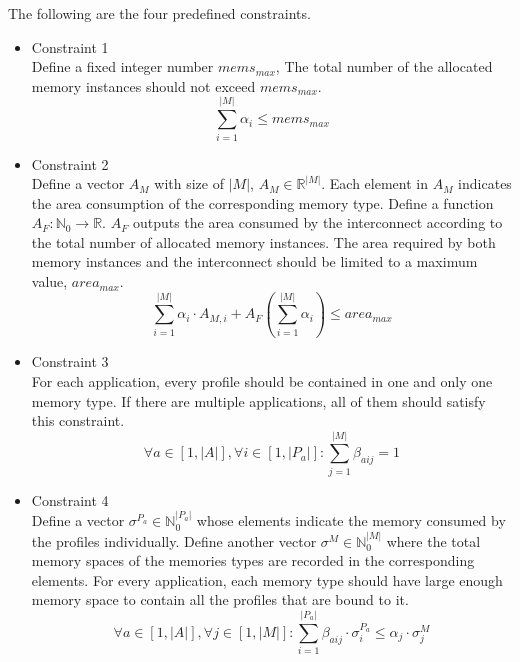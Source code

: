 	The following are the four predefined constraints.
	
	\begin{itemize}
		\item Constraint 1 \\
			Define a fixed integer number $mems_{max}$, 
			The total number of the allocated memory instances
			should not exceed $mems_{max}$.
			\begin{equation}
			\label{equa:constraint_1}
				\sum_{i=1}^{\lvert M \rvert} \alpha_{i}
				\leq mems_{max}
			\end{equation}
		\item Constraint 2 \\
			Define a vector $A_{M}$ with size of $\lvert M \lvert$,
			$A_{M} \in \mathbb{R}^{\lvert M \lvert}$. Each element in
			$A_{M}$ indicates the area consumption of the corresponding
			memory type.
			Define a function $A_{F} \colon \mathbb{N}_{0}
			\rightarrow \mathbb{R}$. $A_{F}$ outputs the area consumed
			by the interconnect according to the total number of allocated
			memory instances.
			The area required by both memory instances and the interconnect
			should be limited to a maximum value, $area_{max}$.
			\begin{equation}
			\label{equa:constraint_2}
				\sum_{i=1}^{\lvert M \rvert} \alpha_{i} \cdot A_{M,i}
				+ A_{F} ( \sum_{i=1}^{\lvert M \rvert} \alpha_{i} ) 
				\leq area_{max}
			\end{equation}			
		\item Constraint 3 \\
			For each application, every profile should be contained in one
			and only one memory type. If there are multiple applications, all
			of them should satisfy this constraint.
			\begin{equation}
			\label{equa:constraint_3}
				\forall a \in \left[ 1, \lvert A \rvert \right], 
				\forall i \in \left[ 1, \lvert P_a \rvert \right] \colon
				\sum_{j=1}^{\lvert M \rvert} \beta_{aij} = 1
			\end{equation}		
		\item Constraint 4 \\
			Define a vector
			$\sigma^{P_{a}} \in \mathbb{N}_{0}^{\lvert P_{a} \rvert} $
			whose elements indicate the memory consumed by the profiles
			individually.
			Define another vector
			$\sigma^{M} \in \mathbb{N}_{0}^{\lvert M \rvert}$
			where the total memory spaces of the memories types are
			recorded in the corresponding elements.
			For every application, each memory type should have large enough 
			memory space to contain all the profiles that are bound to it.
			\begin{equation}
			\label{equa:constraint_4}
				\forall a \in \left[ 1, \lvert A \rvert \right], 
				\forall j \in \left[ 1, \lvert M \rvert \right] \colon
				\sum_{i=1}^{\lvert P_{a} \rvert} \beta_{aij} \cdot
				\sigma_{i}^{P_{a}} \leq \alpha_{j} \cdot \sigma_{j}^{M}
			\end{equation}
	\end{itemize}

